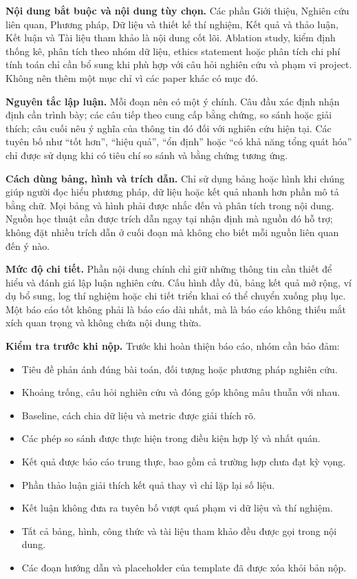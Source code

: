 \documentclass[12pt]{ai_conquer2026}
\begin{document}
\textbf{Nội dung bắt buộc và nội dung tùy chọn.}
Các phần Giới thiệu, Nghiên cứu liên quan, Phương pháp, Dữ liệu và thiết kế thí nghiệm, Kết quả và thảo luận, Kết luận và Tài liệu tham khảo là nội dung cốt lõi. Ablation study, kiểm định thống kê, phân tích theo nhóm dữ liệu, ethics statement hoặc phân tích chi phí tính toán chỉ cần bổ sung khi phù hợp với câu hỏi nghiên cứu và phạm vi project. Không nên thêm một mục chỉ vì các paper khác có mục đó.

\textbf{Nguyên tắc lập luận.}
Mỗi đoạn nên có một ý chính. Câu đầu xác định nhận định cần trình bày; các câu tiếp theo cung cấp bằng chứng, so sánh hoặc giải thích; câu cuối nêu ý nghĩa của thông tin đó đối với nghiên cứu hiện tại. Các tuyên bố như ``tốt hơn'', ``hiệu quả'', ``ổn định'' hoặc ``có khả năng tổng quát hóa'' chỉ được sử dụng khi có tiêu chí so sánh và bằng chứng tương ứng.

\textbf{Cách dùng bảng, hình và trích dẫn.}
Chỉ sử dụng bảng hoặc hình khi chúng giúp người đọc hiểu phương pháp, dữ liệu hoặc kết quả nhanh hơn phần mô tả bằng chữ. Mọi bảng và hình phải được nhắc đến và phân tích trong nội dung. Nguồn học thuật cần được trích dẫn ngay tại nhận định mà nguồn đó hỗ trợ; không đặt nhiều trích dẫn ở cuối đoạn mà không cho biết mỗi nguồn liên quan đến ý nào.

\textbf{Mức độ chi tiết.}
Phần nội dung chính chỉ giữ những thông tin cần thiết để hiểu và đánh giá lập luận nghiên cứu. Cấu hình đầy đủ, bảng kết quả mở rộng, ví dụ bổ sung, log thí nghiệm hoặc chi tiết triển khai có thể chuyển xuống phụ lục. Một báo cáo tốt không phải là báo cáo dài nhất, mà là báo cáo không thiếu mắt xích quan trọng và không chứa nội dung thừa.

\textbf{Kiểm tra trước khi nộp.}
Trước khi hoàn thiện báo cáo, nhóm cần bảo đảm:

\begin{itemize}
\item Tiêu đề phản ánh đúng bài toán, đối tượng hoặc phương pháp nghiên cứu.
\item Khoảng trống, câu hỏi nghiên cứu và đóng góp không mâu thuẫn với nhau.
\item Baseline, cách chia dữ liệu và metric được giải thích rõ.
\item Các phép so sánh được thực hiện trong điều kiện hợp lý và nhất quán.
\item Kết quả được báo cáo trung thực, bao gồm cả trường hợp chưa đạt kỳ vọng.
\item Phần thảo luận giải thích kết quả thay vì chỉ lặp lại số liệu.
\item Kết luận không đưa ra tuyên bố vượt quá phạm vi dữ liệu và thí nghiệm.
\item Tất cả bảng, hình, công thức và tài liệu tham khảo đều được gọi trong nội dung.
\item Các đoạn hướng dẫn và placeholder của template đã được xóa khỏi bản nộp.
\end{itemize}
\end{document}

